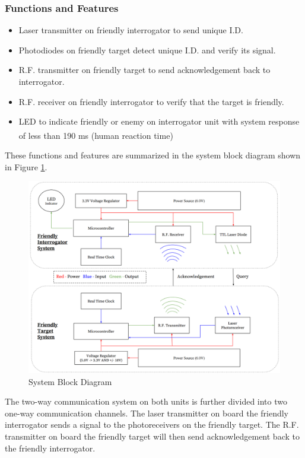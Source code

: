 \documentclass[letterpaper,10pt]{article}
\begin{document}
\begin{spacing}{1.15}
\subsubsection{Functions and Features}
\begin{itemize}
	\item Laser transmitter on friendly interrogator to send unique I.D.
	\item Photodiodes on friendly target detect unique I.D. and verify its signal.
	\item R.F. transmitter on friendly target to send acknowledgement back to interrogator.
	\item R.F. receiver on friendly interrogator to verify that the target is friendly.
	\item LED to indicate friendly or enemy on interrogator unit with system response of less than 190 ms (human reaction time\textsuperscript{\cite{Reaction_Times}})
\end{itemize}

These functions and features are summarized in the system block diagram shown in Figure \ref{fig:system-block-diagram}. 

\begin{figure} [H]
	\centering
	\includegraphics[scale=0.45]{System_Block_Diagram.png}
	\caption{System Block Diagram\label{fig:system-block-diagram}}
\end{figure}

The two-way communication system on both units is further divided into two one-way communication channels. The laser transmitter on board the friendly interrogator sends a signal to the photoreceivers on the friendly target. The R.F. transmitter on board the friendly target will then send acknowledgement back to the friendly interrogator. 


\end{spacing}
\end{document}
